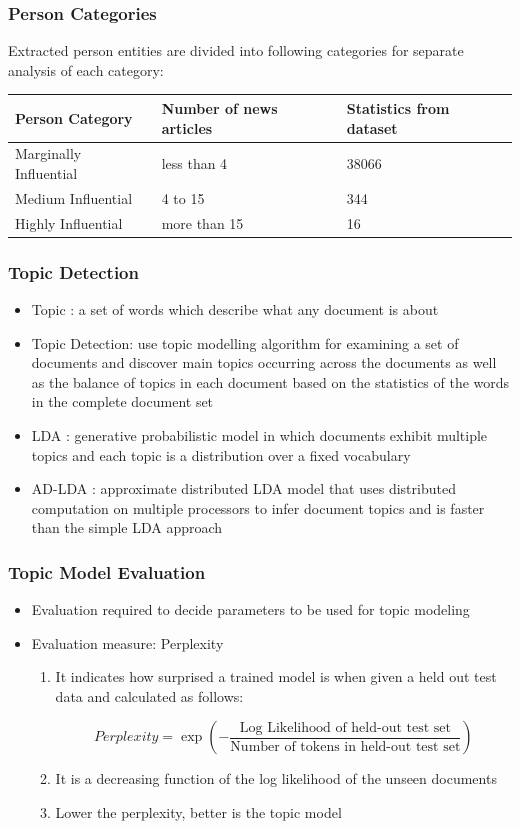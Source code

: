 \documentclass{beamer}
\begin{document}
\begin{frame}
\frametitle{Person Categories}
 Extracted person entities are divided into following categories for separate analysis of each category:
\begin{table}[bt]
\begin{tabular}{|p{3.5cm}|p{3cm}|p{2cm}|} \hline
\textbf{Person Category} & \textbf{Number of news articles}& \textbf{Statistics from dataset} \\ \hline
Marginally Influential & less than 4 & 38066 \\ \hline
Medium Influential & 4 to 15 & 344 \\ \hline
Highly Influential & more than 15 & 16 \\ \hline
\end{tabular}
\end{table}
\end{frame}


\begin{frame}
\frametitle{Topic Detection}
\begin{itemize}
\item
\alert{Topic} : a set of words which describe what any document is about
\item
\alert{Topic Detection}: use topic modelling algorithm for examining a set of documents and discover main topics occurring across the documents as well as the balance of topics in each document based on the statistics of the words in the complete document set
\item
\alert{LDA} :  generative probabilistic model in which documents exhibit multiple topics and each topic is a distribution over a fixed vocabulary
\item
\alert{AD-LDA} : approximate distributed LDA model that uses distributed computation on multiple processors to infer document topics and is faster than the simple LDA approach
\end{itemize}
\end{frame}

\begin{frame}
\frametitle{Topic Model Evaluation}
\begin{itemize}
\item
Evaluation required to decide parameters to be used for topic modeling
\item
Evaluation measure:	\alert{Perplexity}\\
\begin{enumerate}
\item 
It indicates how surprised a trained model is when given a held out test data and calculated as follows:

$$Perplexity= \exp(-\dfrac{\text{Log Likelihood of held-out test set}}{\text{Number of tokens in held-out test set}})$$

\item
It is a decreasing function of the log likelihood of the unseen documents 
\item
Lower the perplexity, better is the topic model
\end{enumerate}
\end{itemize}
\end{frame}
\end{document}
